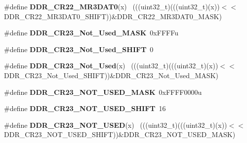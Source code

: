 \begin{DoxyCompactItemize}
\item 
\hypertarget{group___d_d_r___register___masks_gabf68f21714a6bf8ba6aeb1a53ac72633}{}\#define {\bfseries D\+D\+R\+\_\+\+C\+R22\+\_\+\+M\+R3\+D\+A\+T0}(x)                                        ~(((uint32\+\_\+t)(((uint32\+\_\+t)(x))$<$$<$D\+D\+R\+\_\+\+C\+R22\+\_\+\+M\+R3\+D\+A\+T0\+\_\+\+S\+H\+I\+F\+T))\&D\+D\+R\+\_\+\+C\+R22\+\_\+\+M\+R3\+D\+A\+T0\+\_\+\+M\+A\+S\+K)\label{group___d_d_r___register___masks_gabf68f21714a6bf8ba6aeb1a53ac72633}

\item 
\hypertarget{group___d_d_r___register___masks_ga7303d818acc7315cc3cab8146f587b62}{}\#define {\bfseries D\+D\+R\+\_\+\+C\+R23\+\_\+\+Not\+\_\+\+Used\+\_\+\+M\+A\+S\+K}~0x\+F\+F\+F\+Fu\label{group___d_d_r___register___masks_ga7303d818acc7315cc3cab8146f587b62}

\item 
\hypertarget{group___d_d_r___register___masks_ga8419358d5af35014d48fe6437803f3d9}{}\#define {\bfseries D\+D\+R\+\_\+\+C\+R23\+\_\+\+Not\+\_\+\+Used\+\_\+\+S\+H\+I\+F\+T}~0\label{group___d_d_r___register___masks_ga8419358d5af35014d48fe6437803f3d9}

\item 
\hypertarget{group___d_d_r___register___masks_ga8c13a60b8330383ff45b57ec4b38f8f8}{}\#define {\bfseries D\+D\+R\+\_\+\+C\+R23\+\_\+\+Not\+\_\+\+Used}(x)                                      ~(((uint32\+\_\+t)(((uint32\+\_\+t)(x))$<$$<$D\+D\+R\+\_\+\+C\+R23\+\_\+\+Not\+\_\+\+Used\+\_\+\+S\+H\+I\+F\+T))\&D\+D\+R\+\_\+\+C\+R23\+\_\+\+Not\+\_\+\+Used\+\_\+\+M\+A\+S\+K)\label{group___d_d_r___register___masks_ga8c13a60b8330383ff45b57ec4b38f8f8}

\item 
\hypertarget{group___d_d_r___register___masks_gaaaacd5532bba2037ad30526e24b27167}{}\#define {\bfseries D\+D\+R\+\_\+\+C\+R23\+\_\+\+N\+O\+T\+\_\+\+U\+S\+E\+D\+\_\+\+M\+A\+S\+K}~0x\+F\+F\+F\+F0000u\label{group___d_d_r___register___masks_gaaaacd5532bba2037ad30526e24b27167}

\item 
\hypertarget{group___d_d_r___register___masks_gadcd6bb06fb63dda58f63182de59dff2a}{}\#define {\bfseries D\+D\+R\+\_\+\+C\+R23\+\_\+\+N\+O\+T\+\_\+\+U\+S\+E\+D\+\_\+\+S\+H\+I\+F\+T}~16\label{group___d_d_r___register___masks_gadcd6bb06fb63dda58f63182de59dff2a}

\item 
\hypertarget{group___d_d_r___register___masks_ga9f34874f4847399a16ee1a94971cc3c4}{}\#define {\bfseries D\+D\+R\+\_\+\+C\+R23\+\_\+\+N\+O\+T\+\_\+\+U\+S\+E\+D}(x)                                      ~(((uint32\+\_\+t)(((uint32\+\_\+t)(x))$<$$<$D\+D\+R\+\_\+\+C\+R23\+\_\+\+N\+O\+T\+\_\+\+U\+S\+E\+D\+\_\+\+S\+H\+I\+F\+T))\&D\+D\+R\+\_\+\+C\+R23\+\_\+\+N\+O\+T\+\_\+\+U\+S\+E\+D\+\_\+\+M\+A\+S\+K)\label{group___d_d_r___register___masks_ga9f34874f4847399a16ee1a94971cc3c4}


\end{DoxyCompactItemize}
